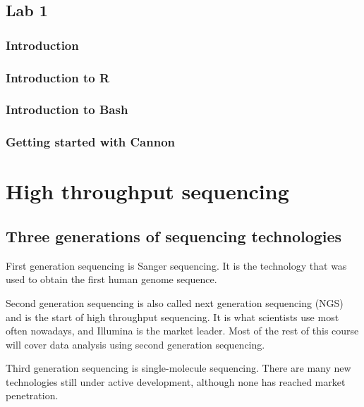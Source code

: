 \documentclass[
]{book}
\begin{document}
\hypertarget{lab-1}{%
\section{Lab 1}\label{lab-1}}

\hypertarget{introduction}{%
\subsection{Introduction}\label{introduction}}

\hypertarget{introduction-to-r}{%
\subsection{Introduction to R}\label{introduction-to-r}}

\hypertarget{introduction-to-bash}{%
\subsection{Introduction to Bash}\label{introduction-to-bash}}

\hypertarget{getting-started-with-cannon}{%
\subsection{Getting started with Cannon}\label{getting-started-with-cannon}}

\hypertarget{ngs}{%
\chapter{High throughput sequencing}\label{ngs}}

\hypertarget{three-generations-of-sequencing-technologies}{%
\section{Three generations of sequencing technologies}\label{three-generations-of-sequencing-technologies}}

First generation sequencing is Sanger sequencing. It is the technology that was used to obtain the first human genome sequence.

Second generation sequencing is also called next generation sequencing (NGS) and is the start of high throughput sequencing. It is what scientists use most often nowadays, and Illumina is the market leader. Most of the rest of this course will cover data analysis using second generation sequencing.

Third generation sequencing is single-molecule sequencing. There are many new technologies still under active development, although none has reached market penetration.
\end{document}
